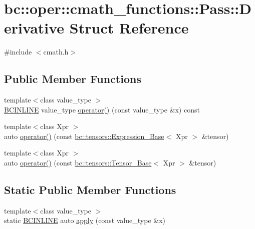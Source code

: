 \hypertarget{structbc_1_1oper_1_1cmath__functions_1_1Pass_1_1Derivative}{}\section{bc\+:\+:oper\+:\+:cmath\+\_\+functions\+:\+:Pass\+:\+:Derivative Struct Reference}
\label{structbc_1_1oper_1_1cmath__functions_1_1Pass_1_1Derivative}


{\ttfamily \#include $<$cmath.\+h$>$}

\subsection*{Public Member Functions}
\begin{DoxyCompactItemize}
\item 
{\footnotesize template$<$class value\+\_\+type $>$ }\\\hyperlink{common_8h_a6699e8b0449da5c0fafb878e59c1d4b1}{B\+C\+I\+N\+L\+I\+NE} value\+\_\+type \hyperlink{structbc_1_1oper_1_1cmath__functions_1_1Pass_1_1Derivative_a66d0b05bb7e41bb8db196e3713e6e10e}{operator()} (const value\+\_\+type \&x) const
\item 
{\footnotesize template$<$class Xpr $>$ }\\auto \hyperlink{structbc_1_1oper_1_1cmath__functions_1_1Pass_1_1Derivative_a6ce657f75aa3d81ce23cd3cfe93d0a21}{operator()} (const \hyperlink{classbc_1_1tensors_1_1Expression__Base}{bc\+::tensors\+::\+Expression\+\_\+\+Base}$<$ Xpr $>$ \&tensor)
\item 
{\footnotesize template$<$class Xpr $>$ }\\auto \hyperlink{structbc_1_1oper_1_1cmath__functions_1_1Pass_1_1Derivative_a22be1df2b3a307d8709d4ed1da2fb681}{operator()} (const \hyperlink{classbc_1_1tensors_1_1Tensor__Base}{bc\+::tensors\+::\+Tensor\+\_\+\+Base}$<$ Xpr $>$ \&tensor)
\end{DoxyCompactItemize}
\subsection*{Static Public Member Functions}
\begin{DoxyCompactItemize}
\item 
{\footnotesize template$<$class value\+\_\+type $>$ }\\static \hyperlink{common_8h_a6699e8b0449da5c0fafb878e59c1d4b1}{B\+C\+I\+N\+L\+I\+NE} auto \hyperlink{structbc_1_1oper_1_1cmath__functions_1_1Pass_1_1Derivative_aed35a8cf24e66c1386bce3960d565106}{apply} (const value\+\_\+type \&x)
\end{DoxyCompactItemize}


